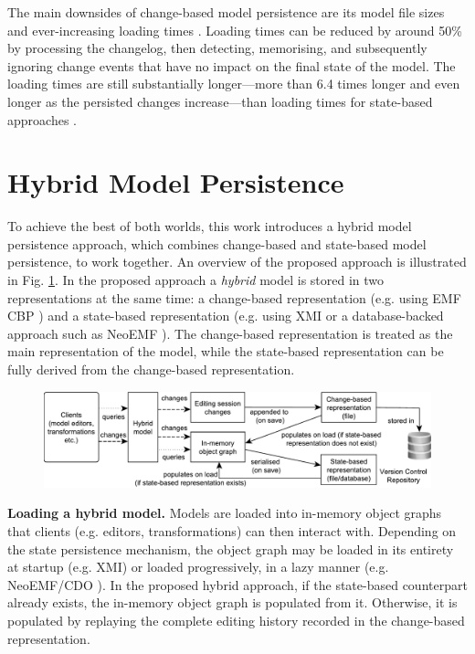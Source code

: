 The main downsides of change-based model persistence are its model file sizes \cite{DBLP:journals/entcs/RobbesL07,DBLP:conf/edoc/KoegelHLHD10} and ever-increasing loading times \cite{mens2002state}. Loading times can be reduced by around 50\% by processing the changelog, then detecting, memorising, and subsequently ignoring change events that have no impact on the final state of the model. The loading times are still substantially longer—more than 6.4 times longer and even longer as the persisted changes increase—than loading times for state-based approaches \cite{yohannis2018towards}.

\section{Hybrid Model Persistence}
\label{sec:hybrid_model_persistence}
To achieve the best of both worlds, this work introduces a hybrid model persistence approach, which combines change-based and state-based model persistence, to work together. An overview of the proposed approach is illustrated in Fig. \ref{fig:hybrid_persistence}. In the proposed approach a \textit{hybrid} model is stored in two representations at the same time: a change-based representation (e.g. using EMF CBP \cite{epsilonlabs2019emfcbp}) and a state-based representation (e.g. using XMI \cite{omg2018xmi} or a database-backed approach such as NeoEMF \cite{daniel2016neoemf}). The change-based representation is treated as the main representation of the model, while the state-based representation can be fully derived from the change-based representation.

\begin{figure}[t]
  \includegraphics[width=\linewidth]{images/hybrid_persistence}
  \label{fig:hybrid_persistence}
\end{figure}

\textbf{Loading a hybrid model.} Models are loaded into in-memory object graphs that clients (e.g. editors, transformations) can then interact with. Depending on the state persistence mechanism, the object graph may be loaded in its entirety at startup (e.g. XMI) or loaded progressively, in a lazy manner (e.g. NeoEMF/CDO \cite{daniel2016neoemf,eclipse2019cdo}). In the proposed hybrid approach, if the state-based counterpart already exists, the in-memory object graph is populated from it. Otherwise, it is populated by replaying the complete editing history recorded in the change-based representation.

